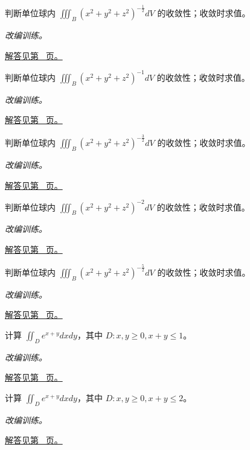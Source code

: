 \documentclass[12pt,fontset=fandol]{ctexart}
\begin{document}
\begin{example}[球心奇点的维数阈值]\label{ex:c40q14}
判断单位球内 $\displaystyle\iiint_B(x^2+y^2+z^2)^{-\frac{1}{2}}dV$ 的收敛性；收敛时求值。
\par\textit{改编训练。}\par\hyperref[ans:c40q14]{解答见第~\pageref{ans:c40q14} 页。}
\end{example}
\begin{example}[球心奇点的维数阈值]\label{ex:c40q15}
判断单位球内 $\displaystyle\iiint_B(x^2+y^2+z^2)^{-1}dV$ 的收敛性；收敛时求值。
\par\textit{改编训练。}\par\hyperref[ans:c40q15]{解答见第~\pageref{ans:c40q15} 页。}
\end{example}
\begin{example}[球心奇点的维数阈值]\label{ex:c40q16}
判断单位球内 $\displaystyle\iiint_B(x^2+y^2+z^2)^{-\frac{3}{2}}dV$ 的收敛性；收敛时求值。
\par\textit{改编训练。}\par\hyperref[ans:c40q16]{解答见第~\pageref{ans:c40q16} 页。}
\end{example}
\begin{example}[球心奇点的维数阈值]\label{ex:c40q17}
判断单位球内 $\displaystyle\iiint_B(x^2+y^2+z^2)^{-2}dV$ 的收敛性；收敛时求值。
\par\textit{改编训练。}\par\hyperref[ans:c40q17]{解答见第~\pageref{ans:c40q17} 页。}
\end{example}
\begin{example}[球心奇点的维数阈值]\label{ex:c40q18}
判断单位球内 $\displaystyle\iiint_B(x^2+y^2+z^2)^{-\frac{5}{2}}dV$ 的收敛性；收敛时求值。
\par\textit{改编训练。}\par\hyperref[ans:c40q18]{解答见第~\pageref{ans:c40q18} 页。}
\end{example}
\begin{example}[三角形上的指数密度]\label{ex:c40q19}
计算 $\displaystyle\iint_D e^{x+y}dxdy$，其中 $D:x,y\ge0,x+y\le 1$。
\par\textit{改编训练。}\par\hyperref[ans:c40q19]{解答见第~\pageref{ans:c40q19} 页。}
\end{example}
\begin{example}[三角形上的指数密度]\label{ex:c40q20}
计算 $\displaystyle\iint_D e^{x+y}dxdy$，其中 $D:x,y\ge0,x+y\le 2$。
\par\textit{改编训练。}\par\hyperref[ans:c40q20]{解答见第~\pageref{ans:c40q20} 页。}
\end{example}
\end{document}
